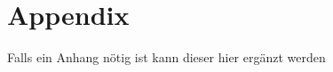 \setcounter{chapter}{0}
\renewcommand\thechapter{\Alph{chapter}}
\chapter{Appendix}

Falls ein Anhang nötig ist kann dieser hier ergänzt werden
